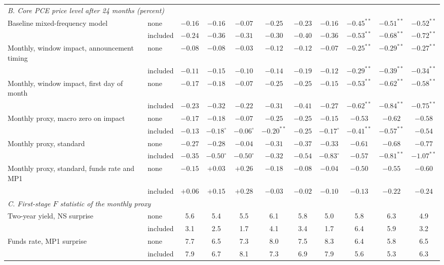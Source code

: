 \begin{tabular}{llccccccccc}
\midrule
\multicolumn{11}{l}{\textit{B. Core PCE price level after 24 months (percent)}}\\
Baseline mixed-frequency model & none & $-0.16$ & $-0.16$ & $-0.07$ & $-0.25$ & $-0.23$ & $-0.16$ & $-0.45^{**}$ & $-0.51^{**}$ & $-0.52^{**}$\\
 & included & $-0.24$ & $-0.36$ & $-0.31$ & $-0.30$ & $-0.40$ & $-0.36$ & $-0.53^{**}$ & $-0.68^{**}$ & $-0.72^{**}$\\
Monthly, window impact, announcement timing & none & $-0.08$ & $-0.08$ & $-0.03$ & $-0.12$ & $-0.12$ & $-0.07$ & $-0.25^{**}$ & $-0.29^{**}$ & $-0.27^{**}$\\
 & included & $-0.11$ & $-0.15$ & $-0.10$ & $-0.14$ & $-0.19$ & $-0.12$ & $-0.29^{**}$ & $-0.39^{**}$ & $-0.34^{**}$\\
Monthly, window impact, first day of month & none & $-0.17$ & $-0.18$ & $-0.07$ & $-0.25$ & $-0.25$ & $-0.15$ & $-0.53^{**}$ & $-0.62^{**}$ & $-0.58^{**}$\\
 & included & $-0.23$ & $-0.32$ & $-0.22$ & $-0.31$ & $-0.41$ & $-0.27$ & $-0.62^{**}$ & $-0.84^{**}$ & $-0.75^{**}$\\
Monthly proxy, macro zero on impact & none & $-0.17$ & $-0.18$ & $-0.07$ & $-0.25$ & $-0.25$ & $-0.15$ & $-0.53$ & $-0.62$ & $-0.58$\\
 & included & $-0.13$ & $-0.18^{\circ}$ & $-0.06^{\circ}$ & $-0.20^{**}$ & $-0.25$ & $-0.17^{\circ}$ & $-0.41^{**}$ & $-0.57^{**}$ & $-0.54$\\
Monthly proxy, standard & none & $-0.27$ & $-0.28$ & $-0.04$ & $-0.31$ & $-0.37$ & $-0.33$ & $-0.61$ & $-0.68$ & $-0.77$\\
 & included & $-0.35$ & $-0.50^{\circ}$ & $-0.50^{\circ}$ & $-0.32$ & $-0.54$ & $-0.83^{\circ}$ & $-0.57$ & $-0.81^{**}$ & $-1.07^{**}$\\
Monthly proxy, standard, funds rate and MP1 & none & $-0.15$ & $+0.03$ & $+0.26$ & $-0.18$ & $-0.08$ & $-0.04$ & $-0.50$ & $-0.55$ & $-0.60$\\
 & included & $+0.06$ & $+0.15$ & $+0.28$ & $-0.03$ & $-0.02$ & $-0.10$ & $-0.13$ & $-0.22$ & $-0.24$\\
\midrule
\multicolumn{11}{l}{\textit{C. First-stage $F$ statistic of the monthly proxy}}\\
Two-year yield, NS surprise & none & 5.6 & 5.4 & 5.5 & 6.1 & 5.8 & 5.0 & 5.8 & 6.3 & 4.9\\
 & included & 3.1 & 2.5 & 1.7 & 4.1 & 3.4 & 1.7 & 6.4 & 5.9 & 3.2\\
Funds rate, MP1 surprise & none & 7.7 & 6.5 & 7.3 & 8.0 & 7.5 & 8.3 & 6.4 & 5.8 & 6.5\\
 & included & 7.9 & 6.7 & 8.1 & 7.3 & 6.9 & 7.9 & 5.6 & 5.3 & 6.3\\
\bottomrule\end{tabular}
